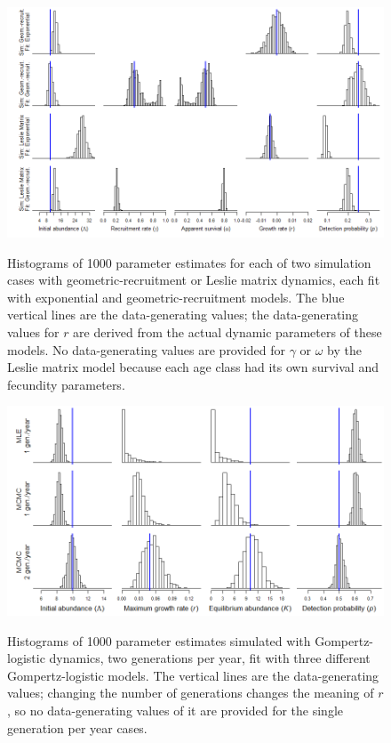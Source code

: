 \documentclass{article}
\begin{document}
\begin{landscape}
\begin{figure}
\caption{Histograms of 1000 parameter estimates for each of two
simulation cases with geometric-recruitment or Leslie matrix dynamics, each fit with 
exponential and geometric-recruitment models. The blue vertical lines are the 
data-generating values; the data-generating values for $r$ are derived from
the actual dynamic parameters of these models.  No data-generating values
are provided for $\gamma$ or $\omega$ by the Leslie matrix model because
each age class had its own survival and fecundity parameters.}
  \centering
  \includegraphics{../figs/geom_mat_hists}
\label{fig:geom_mat_hists}
\end{figure}

\begin{figure}
\caption{Histograms of 1000 parameter estimates simulated with Gompertz-logistic dynamics, 
two generations per year, fit with three different Gompertz-logistic models.
The vertical lines are the data-generating values; changing the number of generations
changes the meaning of $r$, so no data-generating values of it are provided for the 
single generation per year cases.}
  \centering
  \includegraphics{../figs/gomp_hists}
\label{fig:gomp_hists}
\end{figure}
\end{landscape}
\end{document}

